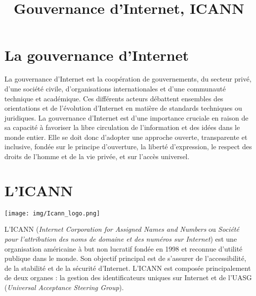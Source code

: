 \documentclass{cs-mpi}
\begin{document}
\title{Gouvernance d'Internet, ICANN}

\section{La gouvernance d'Internet}
%
La gouvernance d’Internet est la coopération de gouvernements, du secteur privé, d’une société civile, d’organisations internationales et d’une communauté technique et académique. Ces différents acteurs débattent ensembles des orientations et de l’évolution d’Internet en matière de standards techniques ou juridiques. La gouvernance d'Internet est d'une importance cruciale en raison de sa capacité à favoriser la libre circulation de l'information et des idées dans le monde entier. Elle se doit donc d'adopter une approche ouverte, transparente et inclusive, fondée sur le principe d'ouverture, la liberté d'expression, le respect des droits de l'homme et de la vie privée, et sur l'accès universel.

\section{L'ICANN}
\begin{center}
\texttt{[image: img/Icann\_logo.png]}
\end{center}

L'ICANN (\emph{Internet Corporation for Assigned Names and Numbers} ou \emph{Société pour l'attribution des noms de domaine et des numéros sur Internet}) est une organisation américaine à but non lucratif fondée en 1998 et reconnue d’utilité publique dans le monde. Son objectif principal est de s'assurer de l'accessibilité, de la stabilité et de la sécurité d’Internet. L'ICANN est composée principalement de deux organes : la gestion des identificateurs uniques sur Internet et de l'UASG (\emph{Universal Acceptance Steering Group}).
\end{document}
